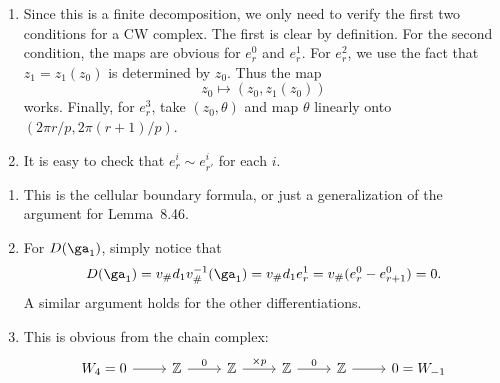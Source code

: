 \documentclass[../../solutions.tex]{subfiles}
\begin{document}
\begin{exercise} \leavevmode
\begin{enumerate}
\item 
Since this is a finite decomposition, we only need to verify the first two conditions for a CW complex.
The first is clear by definition.
For the second condition, the maps are obvious for $e^0_r$ and $e^1_r$.
For $e^2_r$, we use the fact that $z_1=z_1(z_0)$ is determined by $z_0$.
Thus the map
\[z_0\mapsto(z_0,z_1(z_0))\]
works.
Finally, for $e^3_r$, take $(z_0,\theta)$ and map $\theta$ linearly onto $(2\pi r/p,2\pi(r+1)/p)$.

\item
It is easy to check that $e^i_r\sim e^i_{r'}$ for each $i$.
\end{enumerate}
\end{exercise}

\begin{exercise} \leavevmode
\begin{enumerate}
\item 
This is the cellular boundary formula, or just a generalization of the argument for Lemma~8.46.
\item
For $D(\ga_1)$, simply notice that
\[D(\ga_1)=v_\#d_1v_\#^{-1}(\ga_1)=v_\#d_1e^1_r=v_\#(e^0_r-e^0_{r+1})=0.\]
A similar argument holds for the other differentiations.
\item 
This is obvious from the chain complex:
\[
\begin{tikzcd}
W_4=0\ar[r] & \ZZ\ar[r,"0"] & \ZZ\ar[r,"\times p"] & \ZZ\ar[r,"0"] & \ZZ\ar[r] & 0=W_{-1}
\end{tikzcd}
\]

\end{enumerate}
\end{exercise}
\end{document}
